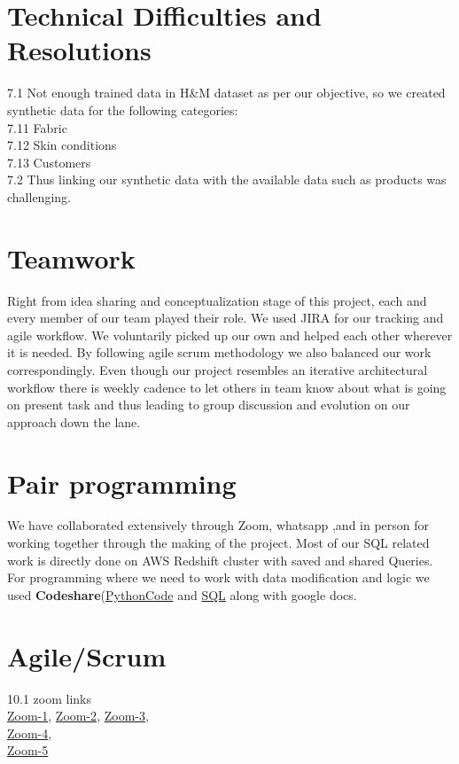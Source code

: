 \documentclass[11pt,journal,compsoc]{IEEEtran}
\begin{document}
\section{Technical Difficulties and Resolutions}
7.1 Not enough trained data in H&M dataset as per our objective, so we created synthetic data  for the following categories: \\
            7.11 Fabric \\
            7.12 Skin conditions \\
            7.13 Customers \\
7.2 Thus linking our synthetic data with the available data such as products was challenging.


\section{Teamwork}
Right from idea sharing and conceptualization stage of this project, each and every member of our team played their role. We used JIRA for our tracking and agile workflow. We voluntarily picked up our own and helped each other wherever it is needed. By following agile scrum methodology we also balanced our work correspondingly. Even though our project resembles an iterative architectural workflow there is weekly cadence to let others in team know about what is going on present task and thus leading to group discussion and evolution on our approach down the lane. 

\section{Pair programming}
We have collaborated extensively through Zoom, whatsapp ,and in person for working together through the making of the project. Most of our SQL related work is directly done on AWS Redshift cluster with saved and shared Queries. For programming where we need to work with data modification and logic we used \textbf{Codeshare}(\href{https://codeshare.io/3Azd7v}{PythonCode} and \href{https://codeshare.io/dwN1PM}{SQL} along with google docs.\\


\section{Agile/Scrum}
10.1 zoom links \\
\href{https://sjsu.zoom.us/j/89341269589?pwd=eGF5c1FSdzZNMjN2d1o3NmM4VWZsZz09}{Zoom-1},  
\href{https://sjsu.zoom.us/j/81816549366?pwd=alFvdDJDb1M4QUlONGRadG43ZHIzdz09}{Zoom-2}, 
\href{https://sjsu.zoom.us/j/82071883934?pwd=dzc5Q0lPUFAvWWlvTitRL1NXNEljQT09}{Zoom-3}, \\  
\href{https://sjsu.zoom.us/j/89073358102?pwd=N1Q1V3NjV2JaWVBwYnEvSXVWbVVtdz09}{Zoom-4}, \\
\href{https://sjsu.zoom.us/j/87444250053?pwd=eEV5UUs0UGRYell2VkVIeE5aL0FPUT09}{Zoom-5} \\
\end{document}
